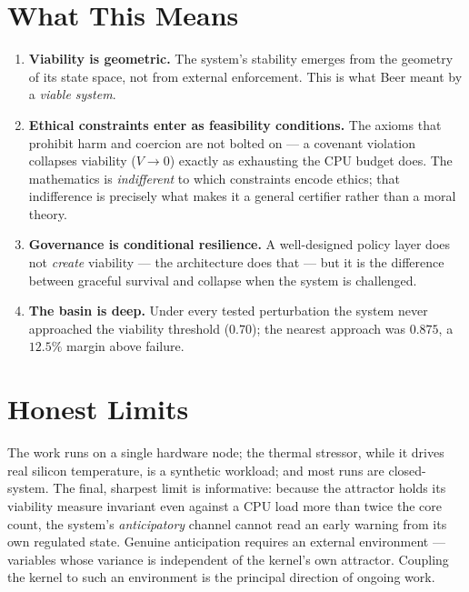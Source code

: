 \documentclass[11pt, a4paper]{article}
\begin{document}
\section*{What This Means}

\begin{enumerate}
  \item \textbf{Viability is geometric.} The system's stability emerges from the
        geometry of its state space, not from external enforcement. This is what
        Beer meant by a \emph{viable system}.

  \item \textbf{Ethical constraints enter as feasibility conditions.} The axioms
        that prohibit harm and coercion are not bolted on --- a covenant violation
        collapses viability ($V \to 0$) exactly as exhausting the CPU budget does.
        The mathematics is \emph{indifferent} to which constraints encode ethics;
        that indifference is precisely what makes it a general certifier rather than
        a moral theory.

  \item \textbf{Governance is conditional resilience.} A well-designed policy layer
        does not \emph{create} viability --- the architecture does that --- but it is
        the difference between graceful survival and collapse when the system is
        challenged.

  \item \textbf{The basin is deep.} Under every tested perturbation the system never
        approached the viability threshold ($0.70$); the nearest approach was
        $0.875$, a $12.5\%$ margin above failure.
\end{enumerate}

\section*{Honest Limits}

The work runs on a single hardware node; the thermal stressor, while it drives real
silicon temperature, is a synthetic workload; and most runs are closed-system. The
final, sharpest limit is informative: because the attractor holds its viability
measure invariant even against a CPU load more than twice the core count, the
system's \emph{anticipatory} channel cannot read an early warning from its own
regulated state. Genuine anticipation requires an external environment ---
variables whose variance is independent of the kernel's own attractor. Coupling the
kernel to such an environment is the principal direction of ongoing work.
\end{document}
